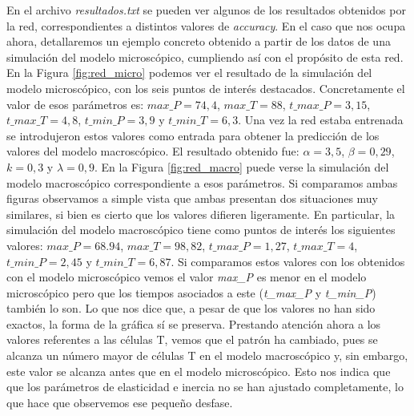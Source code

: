 En el archivo \textit{resultados.txt} se pueden ver algunos de los resultados obtenidos por la red, correspondientes a distintos valores de \textit{accuracy}. En el caso que nos ocupa ahora, detallaremos un ejemplo concreto obtenido a partir de los datos de una simulación del modelo microscópico, cumpliendo así con el propósito de esta red. En la Figura \ref{fig:red_micro} podemos ver el resultado de la simulación del modelo microscópico, con los seis puntos de interés destacados. Concretamente el valor de esos parámetros es: $\textit{max\_P} = 74,4$, $\textit{max\_T} = 88$, $\textit{t\_max\_P} = 3,15$, $\textit{t\_max\_T} = 4,8$, $\textit{t\_min\_P} = 3,9$ y  $\textit{t\_min\_T} = 6,3$. Una vez la red estaba entrenada se introdujeron estos valores como entrada para obtener la predicción de los valores del modelo macroscópico. El resultado obtenido fue: $\alpha = 3,5$, $\beta = 0,29$, $k = 0,3$ y $\lambda = 0,9$. En la Figura \ref{fig:red_macro} puede verse la simulación del modelo macroscópico correspondiente a esos parámetros. Si comparamos ambas figuras observamos a simple vista que ambas presentan dos situaciones muy similares, si bien es cierto que los valores difieren ligeramente. En particular, la simulación del modelo macroscópico tiene como puntos de interés los siguientes valores: $\textit{max\_P} = 68.94$, $\textit{max\_T} = 98,82$, $\textit{t\_max\_P} = 1,27$, $\textit{t\_max\_T} =4$, $\textit{t\_min\_P} = 2,45$ y  $\textit{t\_min\_T} = 6,87$. Si comparamos estos valores con los obtenidos con el modelo microscópico vemos el valor \textit{max\_P} es menor en el modelo microscópico pero que los tiempos asociados a este (\textit{t\_max\_P} y \textit{t\_min\_P}) también lo son. Lo que nos dice que, a pesar de que los valores no han sido exactos, la forma de la gráfica sí se preserva. Prestando atención ahora a los valores referentes a las células T, vemos que el patrón ha cambiado, pues se alcanza un número mayor de células T en el modelo macroscópico y, sin embargo, este valor se alcanza antes que en el modelo microscópico. Esto nos indica que que los parámetros de elasticidad e inercia no se han ajustado completamente, lo que hace que observemos ese pequeño desfase.



